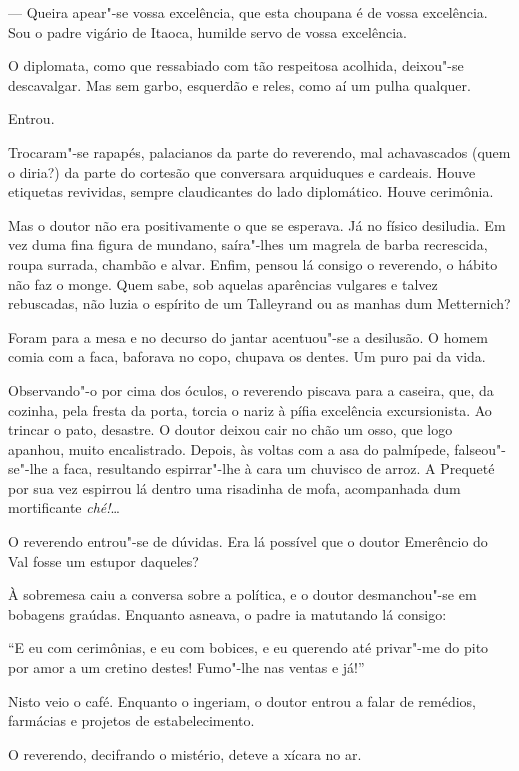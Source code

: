 --- Queira apear"-se vossa excelência, que esta choupana é de vossa
excelência. Sou o padre vigário de Itaoca, humilde servo de vossa
excelência.

O diplomata, como que ressabiado com tão respeitosa acolhida, deixou"-se
descavalgar. Mas sem garbo, esquerdão e reles, como aí um pulha
qualquer.

Entrou.

Trocaram"-se rapapés, palacianos da parte do reverendo, mal achavascados
(quem o diria?) da parte do cortesão que conversara arquiduques e
cardeais. Houve etiquetas revividas, sempre claudicantes do lado
diplomático. Houve cerimônia.

Mas o doutor não era positivamente o que se esperava. Já no físico
desiludia. Em vez duma fina figura de mundano, saíra"-lhes um magrela de
barba recrescida, roupa surrada, chambão e alvar. Enfim, pensou lá
consigo o reverendo, o hábito não faz o monge. Quem sabe, sob aquelas
aparências vulgares e talvez rebuscadas, não luzia o espírito de um
Talleyrand ou as manhas dum Metternich?

Foram para a mesa e no decurso do jantar acentuou"-se a desilusão. O
homem comia com a faca, baforava no copo, chupava os dentes. Um puro pai
da vida.

Observando"-o por cima dos óculos, o reverendo piscava para a caseira,
que, da cozinha, pela fresta da porta, torcia o nariz à pífia excelência
excursionista. Ao trincar o pato, desastre. O doutor deixou cair no chão
um osso, que logo apanhou, muito encalistrado. Depois, às voltas com a
asa do palmípede, falseou"-se"-lhe a faca, resultando espirrar"-lhe à cara
um chuvisco de arroz. A Prequeté por sua vez espirrou lá dentro uma
risadinha de mofa, acompanhada dum mortificante \emph{ché!}\ldots{}

O reverendo entrou"-se de dúvidas. Era lá possível que o doutor Emerêncio
do Val fosse um estupor daqueles?

À sobremesa caiu a conversa sobre a política, e o doutor desmanchou"-se
em bobagens graúdas. Enquanto asneava, o padre ia matutando lá consigo:

``E eu com cerimônias, e eu com bobices, e eu querendo até privar"-me do
pito por amor a um cretino destes! Fumo"-lhe nas ventas e já!''

Nisto veio o café. Enquanto o ingeriam, o doutor entrou a falar de
remédios, farmácias e projetos de estabelecimento.

O reverendo, decifrando o mistério, deteve a xícara no ar.

